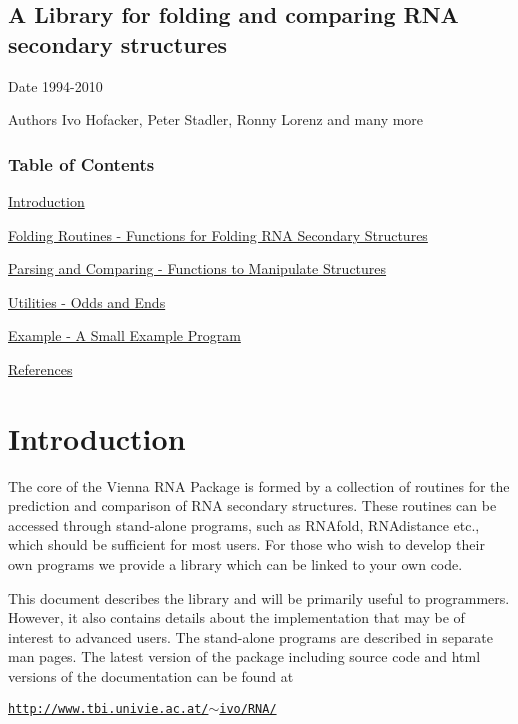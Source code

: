 \par


\subsection*{A Library for folding and comparing RNA secondary structures}



\par


\begin{DoxyDate}{Date}
1994-\/2010 
\end{DoxyDate}
\begin{DoxyAuthor}{Authors}
Ivo Hofacker, Peter Stadler, Ronny Lorenz and many more
\end{DoxyAuthor}
\subsubsection*{Table of Contents}





\begin{DoxyItemize}
\item \hyperlink{main_mp_intro}{Introduction} \item \hyperlink{mp__fold}{Folding Routines -\/ Functions for Folding RNA Secondary Structures} \item \hyperlink{mp__parse}{Parsing and Comparing -\/ Functions to Manipulate Structures} \item \hyperlink{mp__utils}{Utilities -\/ Odds and Ends} \item \hyperlink{mp__example}{Example -\/ A Small Example Program} \item \hyperlink{mp__ref}{References}\end{DoxyItemize}


\hypertarget{main_mp_intro}{}\section{Introduction}\label{main_mp_intro}
The core of the Vienna RNA Package is formed by a collection of routines for the prediction and comparison of RNA secondary structures. These routines can be accessed through stand-\/alone programs, such as RNAfold, RNAdistance etc., which should be sufficient for most users. For those who wish to develop their own programs we provide a library which can be linked to your own code.

This document describes the library and will be primarily useful to programmers. However, it also contains details about the implementation that may be of interest to advanced users. The stand-\/alone programs are described in separate man pages. The latest version of the package including source code and html versions of the documentation can be found at \par
\par
 \href{http://www.tbi.univie.ac.at/~ivo/RNA/}{\tt http://www.tbi.univie.ac.at/$\sim$ivo/RNA/} 